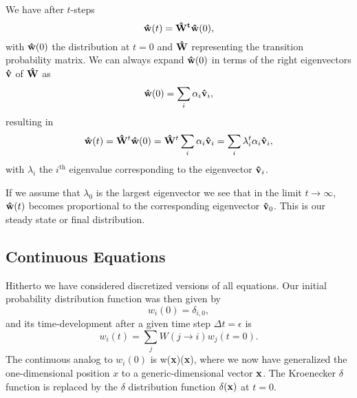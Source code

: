 We have after $t$-steps
\[
   {\bf \hat{w}}(t) = {\bf \hat{W}^t\hat{w}}(0),
\]
with ${\bf \hat{w}}(0)$ the distribution at $t=0$ and ${\bf \hat{W}}$ representing the 
transition probability matrix. 
We can always expand ${\bf \hat{w}}(0)$ in terms of the right eigenvectors 
${\bf \hat{v}}$ of ${\bf \hat{W}}$ as 
\[
    {\bf \hat{w}}(0)  = \sum_i\alpha_i{\bf \hat{v}}_i,
\]
resulting in 
\[
   {\bf \hat{w}}(t) = {\bf \hat{W}}^t{\bf \hat{w}}(0)={\bf \hat{W}}^t\sum_i\alpha_i{\bf \hat{v}}_i=
\sum_i\lambda_i^t\alpha_i{\bf \hat{v}}_i,
\]
with $\lambda_i$ the $i^{\mathrm{th}}$ eigenvalue corresponding to  
the eigenvector ${\bf \hat{v}}_i$. 

If we assume that $\lambda_0$ is the largest eigenvector we see that in the limit $t\rightarrow \infty$,
${\bf \hat{w}}(t)$ becomes proportional to the corresponding eigenvector 
${\bf \hat{v}}_0$. This is our steady state or final distribution. 

 
\subsection{Continuous Equations}

Hitherto we have considered discretized versions of all equations. Our initial probability
distribution function was then given by 
\[
   w_i(0) = \delta_{i,0},
\]
and its time-development after a given time step $\Delta t=\epsilon$ is
\[ 
   w_i(t) = \sum_{j}W(j\rightarrow i)w_j(t=0).
\]   
The continuous analog to $w_i(0)$ is
\be
   w({\bf x})\rightarrow \delta({\bf x}),
\ee
where we now have generalized the one-dimensional position $x$ to a generic-dimensional  
vector ${\bf x}$. The Kroenecker $\delta$ function is replaced by the $\delta$ distribution
function $\delta({\bf x})$ at  $t=0$.  

